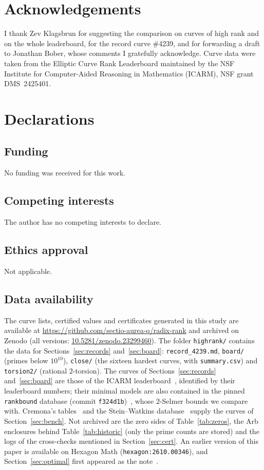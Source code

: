 \documentclass[11pt]{amsart}
\theoremstyle{remark}
\theoremstyle{definition}
\begin{document}
\section*{Acknowledgements}
I thank Zev Klagsbrun for suggesting the comparison on curves of high rank and on the whole leaderboard, for the record curve \#4239, and for forwarding a draft to Jonathan Bober, whose comments I gratefully acknowledge. Curve data were taken from the Elliptic Curve Rank Leaderboard maintained by the NSF Institute
for Computer-Aided Reasoning in Mathematics (ICARM), NSF grant DMS~2425401.

\section*{Declarations}

\subsection*{Funding} No funding was received for this work.

\subsection*{Competing interests} The author has no competing interests to declare.

\subsection*{Ethics approval} Not applicable.

\subsection*{Data availability} The curve lists, certified values and certificates generated in this study are available at \url{https://github.com/sectio-aurea-q/radix-rank} and archived on Zenodo (all versions: \href{https://doi.org/10.5281/zenodo.23299460}{10.5281/zenodo.23299460}). The folder \texttt{highrank/} contains the data for Sections~\ref{sec:records} and~\ref{sec:board}: \texttt{record\_4239.md}, \texttt{board/} (primes below $10^{10}$), \texttt{close/} (the sixteen hardest curves, with \texttt{summary.csv}) and \texttt{torsion2/} (rational $2$-torsion). The curves of Sections~\ref{sec:records} and~\ref{sec:board} are those of the ICARM leaderboard~\cite{ICARM}, identified by their leaderboard numbers; their minimal models are also contained in the pinned \texttt{rankbound} database (commit \texttt{f324d1b})~\cite{Jain}, whose $2$-Selmer bounds we compare with. Cremona's tables~\cite{Cremona} and the Stein--Watkins database~\cite{SW} supply the curves of Section~\ref{sec:bench}. Not archived are the zero sides of Table~\ref{tab:zeros}, the Arb enclosures behind Table~\ref{tab:historic} (only the prime counts are stored) and the logs of the cross-checks mentioned in Section~\ref{sec:cert}. An earlier version of this paper is available on Hexagon Math (\texttt{hexagon:2610.00346}), and Section~\ref{sec:optimal} first appeared as the note~\cite{HacOpt}.
\end{document}
